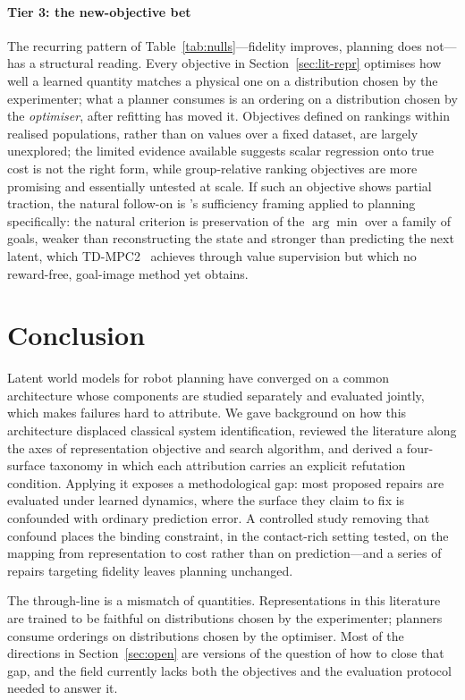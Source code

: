 \documentclass[11pt,letterpaper]{article}
\begin{document}
\paragraph{Tier 3: the new-objective bet}
The recurring pattern of Table~\ref{tab:nulls}---fidelity improves, planning
does not---has a structural reading. Every objective in
Section~\ref{sec:lit-repr} optimises how well a learned quantity matches a
physical one on a distribution chosen by the experimenter; what a planner
consumes is an ordering on a distribution chosen by the \emph{optimiser},
after refitting has moved it. Objectives defined on rankings within realised
populations, rather than on values over a fixed dataset, are largely
unexplored; the limited evidence available suggests scalar regression onto
true cost is not the right form, while group-relative ranking objectives are
more promising and essentially untested at scale. If such an objective shows
partial traction, the natural follow-on is \citet{kim2026latentstate}'s
sufficiency framing applied to planning specifically: the natural criterion is
preservation of the $\arg\min$ over a family of goals, weaker than
reconstructing the state and stronger than predicting the next latent, which
TD-MPC2~\citep{hansen2024tdmpc2} achieves through value supervision but which
no reward-free, goal-image method yet obtains.

\section{Conclusion}\label{sec:conclusion}

Latent world models for robot planning have converged on a common architecture
whose components are studied separately and evaluated jointly, which makes
failures hard to attribute. We gave background on how this architecture displaced
classical system identification, reviewed the literature along the axes of
representation objective and search algorithm, and derived a four-surface
taxonomy in which each attribution carries an explicit refutation condition.
Applying it exposes a methodological gap: most proposed repairs are evaluated
under learned dynamics, where the surface they claim to fix is confounded with
ordinary prediction error. A controlled study removing that confound places the
binding constraint, in the contact-rich setting tested, on the mapping from
representation to cost rather than on prediction---and a series of repairs
targeting fidelity leaves planning unchanged.

The through-line is a mismatch of quantities. Representations in this literature
are trained to be faithful on distributions chosen by the experimenter; planners
consume orderings on distributions chosen by the optimiser. Most of the
directions in Section~\ref{sec:open} are versions of the question of how to close
that gap, and the field currently lacks both the objectives and the evaluation
protocol needed to answer it.



\end{document}
